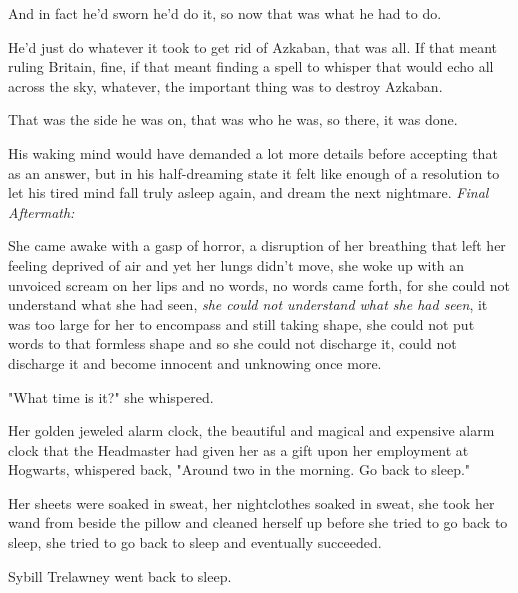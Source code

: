 And in fact he'd sworn he'd do it, so now that was what he had to do.

He'd just do whatever it took to get rid of Azkaban, that was all. If that 
meant ruling Britain, fine, if that meant finding a spell to whisper that would 
echo all across the sky, whatever, the important thing was to destroy Azkaban.

That was the side he was on, that was who he was, so there, it was done.

His waking mind would have demanded a lot more details before accepting that as 
an answer, but in his half-dreaming state it felt like enough of a resolution 
to let his tired mind fall truly asleep again, and dream the next nightmare.
\sbreak
\emph{Final Aftermath:}

She came awake with a gasp of horror, a disruption of her breathing that left 
her feeling deprived of air and yet her lungs didn't move, she woke up with an 
unvoiced scream on her lips and no words, no words came forth, for she could 
not understand what she had seen, \emph{she could not understand what she had 
seen}, it was too large for her to encompass and still taking shape, she could 
not put words to that formless shape and so she could not discharge it, could 
not discharge it and become innocent and unknowing once more.

"What time is it?" she whispered.

Her golden jeweled alarm clock, the beautiful and magical and expensive alarm 
clock that the Headmaster had given her as a gift upon her employment at 
Hogwarts, whispered back, "Around two in the morning. Go back to sleep."

Her sheets were soaked in sweat, her nightclothes soaked in sweat, she took her 
wand from beside the pillow and cleaned herself up before she tried to go back 
to sleep, she tried to go back to sleep and eventually succeeded.

Sybill Trelawney went back to sleep.